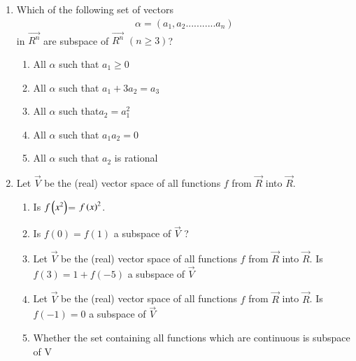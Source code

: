 \renewcommand{\theequation}{\theenumi}
\renewcommand{\thefigure}{\theenumi}
\begin{enumerate}[label=\thesubsection.\arabic*.,ref=\thesubsection.\theenumi]
%
\item Which of the following set of vectors
\begin{align}\alpha=(a_1,a_2...........a_n)\nonumber\end{align} in $\vec{R^n}$ are subspace of $\vec{R^n}$ $(n\geq3)$?\\
\begin{enumerate}
\item All $\alpha$ such that $a_1\geq0$\\
\item All $\alpha$ such that $a_1+3a_2=a_3$\\
\item All $\alpha$ such that$a_2=a_1^{2}$\\
\item All $\alpha$ such that $a_1a_2=0$\\
\item All $\alpha$ such that $a_2$ is rational
\end{enumerate}
%
\solution

\item Let $\vec{V}$ be the (real) vector space of all functions $f$
from $\vec{R}$ into $\vec{R}$. 
%
\begin{enumerate}
\item Is $f\left({x^2}\right)$= $f\left({x}\right)^2$.
%
\solution

\item Is $f(0) = f(1)$ a
subspace of $\vec{V}$ ?
\\
\solution

\item Let $\vec{V}$ be the (real) vector space of all functions $f$
from $\vec{R}$ into $\vec{R}$. Is $f(3)=1+f(-5)$ a
subspace of $\vec{V}$ 
%
\\
\solution

%
\item Let $\vec{V}$ be the (real) vector space of all functions $f$
from $\vec{R}$ into $\vec{R}$. Is $f(-1) = 0 $ a
subspace of $\vec{V}$ 
%
\\
\solution

\item Whether the set containing all functions which are continuous is subspace of V
\\
\solution


\end{enumerate}
\end{enumerate}
